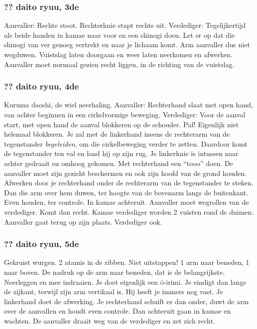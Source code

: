 \subsubsection{?? daito ryuu, 3de}
Aanvaller: Rechte stoot. Rechterknie stapt rechts uit.
Verdediger: Tegelijkertijd als beide handen in kamae naar voor en een shinogi doen.
Let er op dat die shinogi van ver genoeg vertrekt en naar je lichaam komt.
Arm aanvaller dus niet wegduwen.
Vuistslag laten doorgaan en weer laten neerkomen en afwerken.
Aanvaller moet normaal gezien recht liggen, in de richting van de vuistslag.

\subsubsection{?? daito ryuu, 4de}
Kuruma daoshi, de wiel neerhaling.
Aanvaller: Rechterhand slaat met open hand, van achter beginnen in een cirkelvormige beweging.
Verdediger: Voor de aanval start, met open hand de aanval blokkeren op de schouder. Paf!
Eigenlijk niet helemaal blokkeren. Je zal met de linkerhand ineens de rechterarm van de tegenstander \textit{begeleiden},
om die cirkelbeweging verder te zetten. Daardoor komt de tegenstander ten val en land hij op zijn rug.
Je linkerknie is intussen naar achter gedraait en omhoog gekomen.
Met rechterhand een ``tooo'' doen.
De aanvaller moet zijn gezicht beschermen en ook zijn hoofd van de grond houden.
Afwerken door je rechterhand onder de rechterarm van de tegenstander te steken. Dan die arm over hem duwen, ter hoogte van de bovenarm langs de buitenkant.
Even houden, ter controle.
In kamae achteruit.
Aanvaller moet wegrollen van de verdediger.
Komt dan recht.
Kamae verdediger worden 2 vuisten rond de duimen.
Aanvaller gaat terug op zijn plaats.
Verdediger ook.

\subsubsection{?? daito ryuu, 5de}
Gekruist wurgen.
2 atamis in de ribben.
Niet uitstappen!
1 arm naar beneden, 1 naar boven.
De nadruk op de arm naar beneden, dat is de belangrijkste.
Neerleggen en mee indraaien.
Je doet eigenlijk een \={o}-irimi.
Je eindigt dan langs de zijkant, terwijl zijn arm vertikaal is.
Hij heeft je immers nog vast.
Je linkerhand doet de afwerking.
Je rechterhand schuift er dan onder, duwt de arm over de aanvallen en houdt even controle.
Dan achteruit gaan in kamae en wachten.
De aanvaller draait weg van de verdediger en zet zich recht.

